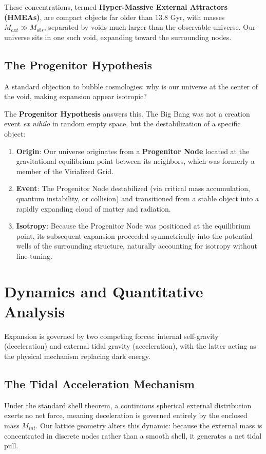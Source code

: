 \documentclass{article}
\begin{document}
These concentrations, termed \textbf{Hyper-Massive External Attractors (HMEAs)}, are compact objects far older than 13.8 Gyr, with masses $M_{ext} \gg M_{obs}$, separated by voids much larger than the observable universe.
Our universe sits in one such void, expanding toward the surrounding nodes.


\subsection{The Progenitor Hypothesis}
\label{sec:progenitor}
A standard objection to bubble cosmologies: why is our universe at the center of the void, making expansion appear isotropic?

The \textbf{Progenitor Hypothesis} answers this.
The Big Bang was not a creation event \textit{ex nihilo} in random empty space, but the destabilization of a specific object:

\begin{enumerate}
\item \textbf{Origin}: Our universe originates from a \textbf{Progenitor Node} located at the gravitational equilibrium point between its neighbors, which was formerly a member of the Virialized Grid.
\item \textbf{Event}: The Progenitor Node destabilized (via critical mass accumulation, quantum instability, or collision) and transitioned from a stable object into a rapidly expanding cloud of matter and radiation.
\item \textbf{Isotropy}: Because the Progenitor Node was positioned at the equilibrium point, its subsequent expansion proceeded symmetrically into the potential wells of the surrounding structure, naturally accounting for isotropy without fine-tuning.
\end{enumerate}

\section{Dynamics and Quantitative Analysis}
\label{sec:dynamics}
Expansion is governed by two competing forces: internal self-gravity (deceleration) and external tidal gravity (acceleration), with the latter acting as the physical mechanism replacing dark energy.

\subsection{The Tidal Acceleration Mechanism}
\label{sec:tidal}
Under the standard shell theorem, a continuous spherical external distribution exerts no net force, meaning deceleration is governed entirely by the enclosed mass $M_{int}$. Our lattice geometry alters this dynamic: because the external mass is concentrated in discrete nodes rather than a smooth shell, it generates a net tidal pull.
\end{document}
